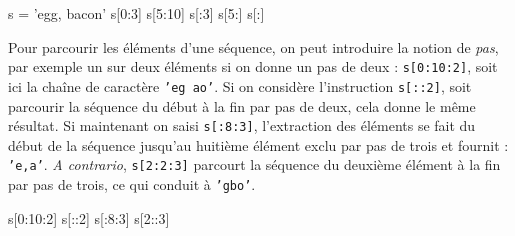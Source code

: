 \begin{idleconsole}
	\begin{pyconsole}
s = 'egg, bacon'
s[0:3]
s[5:10]
s[:3]
s[5:]
s[:]
	\end{pyconsole}
\end{idleconsole}

Pour parcourir les éléments d'une séquence, on peut introduire la notion de \emph{pas}, par exemple un sur deux éléments si on donne un pas de deux : \texttt{s[0:10:2]}, soit ici la chaîne de caractère \texttt{'eg ao'}. Si on considère l'instruction \texttt{s[::2]}, soit parcourir la séquence du début à la fin par pas de deux, cela donne le même résultat.
Si maintenant on saisi \texttt{s[:8:3]}, l'extraction des éléments se fait du début de la séquence jusqu'au huitième élément exclu par pas de trois et fournit : \texttt{'e,a'}. \textit{A contrario}, \texttt{s[2:2:3]} parcourt la séquence du deuxième élément à la fin par pas de trois, ce qui conduit à \texttt{'gbo'}.

\begin{idleconsole}
	\begin{pyconsole}
s[0:10:2]
s[::2]
s[:8:3]
s[2::3]
	\end{pyconsole}
\end{idleconsole}

